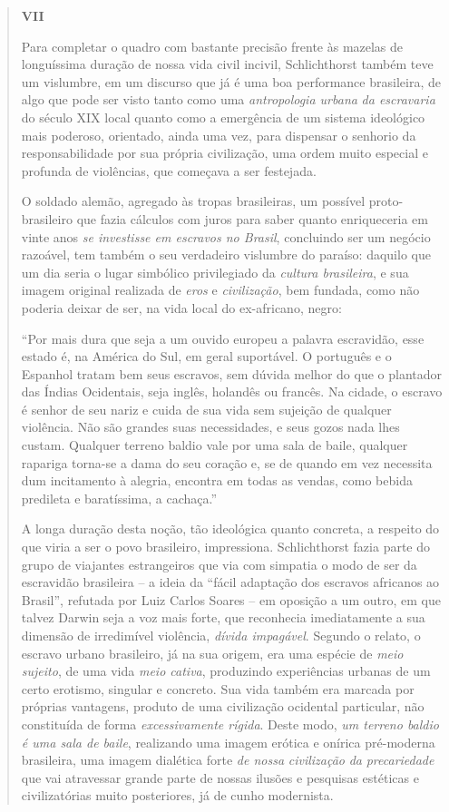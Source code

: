 \begin{quote}
\textbf{VII}

Para completar o quadro com bastante precisão frente às mazelas de
longuíssima duração de nossa vida civil incivil, Schlichthorst também
teve um vislumbre, em um discurso que já é uma boa performance
brasileira, de algo que pode ser visto tanto como uma \emph{antropologia
urbana} \emph{da escravaria} do século XIX local quanto como a
emergência de um sistema ideológico mais poderoso, orientado, ainda uma
vez, para dispensar o senhorio da responsabilidade por sua própria
civilização, uma ordem muito especial e profunda de violências, que
começava a ser festejada.

O soldado alemão, agregado às tropas brasileiras, um possível
proto-brasileiro que fazia cálculos com juros para saber quanto
enriqueceria em vinte anos \emph{se investisse em escravos no Brasil},
concluindo ser um negócio razoável, tem também o seu verdadeiro
vislumbre do paraíso: daquilo que um dia seria o lugar simbólico
privilegiado da \emph{cultura brasileira}, e sua imagem original
realizada de \emph{eros} e \emph{civilização}, bem fundada, como não
poderia deixar de ser, na vida local do ex-africano, negro:

``Por mais dura que seja a um ouvido europeu a palavra escravidão, esse
estado é, na América do Sul, em geral suportável. O português e o
Espanhol tratam bem seus escravos, sem dúvida melhor do que o plantador
das Índias Ocidentais, seja inglês, holandês ou francês. Na cidade, o
escravo é senhor de seu nariz e cuida de sua vida sem sujeição de
qualquer violência. Não são grandes suas necessidades, e seus gozos nada
lhes custam. Qualquer terreno baldio vale por uma sala de baile,
qualquer rapariga torna-se a dama do seu coração e, se de quando em vez
necessita dum incitamento à alegria, encontra em todas as vendas, como
bebida predileta e baratíssima, a cachaça.''

A longa duração desta noção, tão ideológica quanto concreta, a respeito
do que viria a ser o povo brasileiro, impressiona. Schlichthorst fazia
parte do grupo de viajantes estrangeiros que via com simpatia o modo de
ser da escravidão brasileira -- a ideia da ``fácil adaptação dos
escravos africanos ao Brasil'', refutada por Luiz Carlos Soares -- em
oposição a um outro, em que talvez Darwin seja a voz mais forte, que
reconhecia imediatamente a sua dimensão de irredimível violência,
\emph{dívida impagável}. Segundo o relato, o escravo urbano brasileiro,
já na sua origem, era uma espécie de \emph{meio sujeito}, de uma vida
\emph{meio cativa}, produzindo experiências urbanas de um certo
erotismo, singular e concreto. Sua vida também era marcada por próprias
vantagens, produto de uma civilização ocidental particular, não
constituída de forma \emph{excessivamente rígida}. Deste modo, \emph{um
terreno baldio} \emph{é uma sala de baile}, realizando uma imagem
erótica e onírica pré-moderna brasileira, uma imagem dialética forte
\emph{de nossa} \emph{civilização} \emph{da} \emph{precariedade} que vai
atravessar grande parte de nossas ilusões e pesquisas estéticas e
civilizatórias muito posteriores, já de cunho modernista.


\end{quote}
